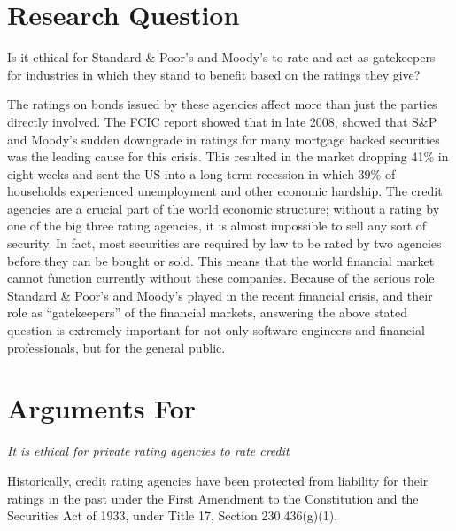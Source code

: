 \documentclass[11pt]{article}
\begin{document}
\begin{multicols}{2}

\section{Research Question}
Is it ethical for Standard \& Poor's and Moody's to rate and act as gatekeepers for industries in which they stand to benefit based on the ratings they give?

The ratings on bonds issued by these agencies affect more than just the parties directly involved. The FCIC report showed that in late 2008, showed that S\&P and Moody's sudden downgrade in ratings for many mortgage backed securities was the leading cause for this crisis. \cite{huffCreditCause}  This resulted in the market dropping 41\% in eight weeks \cite{marketWatch} and sent the US into a long-term recession in which 39\% of households experienced unemployment and other economic hardship. \cite{collapseImpact}  The credit agencies are a crucial part of the world economic structure; without a rating by one of the big three rating agencies, it is almost impossible to sell any sort of security.  In fact, most securities are required by law to be rated by two agencies before they can be bought or sold. \cite{wpMoodies}  This means that the world financial market cannot function currently without these companies.  Because of the serious role Standard \& Poor's and Moody's played in the recent financial crisis, and their role as ``gatekeepers'' of the financial markets, answering the above stated question is extremely important for not only software engineers and financial professionals, but for the general public.    


\section{Arguments For}
\textit{It is ethical for private rating agencies to rate credit}

Historically, credit rating agencies have been protected from liability for their ratings in the past under the First Amendment to the Constitution and the Securities Act of 1933, under Title 17, Section 230.436(g)(1).  


\end{multicols}
\end{document}
